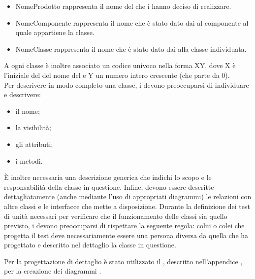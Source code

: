					\begin{itemize}
						\item NomeProdotto rappresenta il nome del   che i  hanno deciso di realizzare.
						\item NomeComponente rappresenta il nome che è stato dato dai  al componente al quale appartiene la classe.
						\item NomeClasse rappresenta il nome che è stato dato dai  alla classe individuata.
					\end{itemize}
					A ogni classe è inoltre associato un codice univoco nella forma XY, dove X è l'iniziale del del nome del  e Y un numero intero crescente (che parte da 0).\\
				 \label{sec:DescrizioneClasse}
					Per descrivere in modo completo una classe, i  devono preoccuparsi di individuare e descrivere:
					\begin{itemize}
						\item il nome;
						\item la visibilità;
						\item gli attributi;
						\item i metodi.
					\end{itemize}
					È inoltre necessaria una descrizione generica che indichi lo scopo e le responsabilità della classe in questione. Infine, devono essere descritte dettagliatamente (anche mediante l'uso di appropriati diagrammi) le relazioni con altre classi e le interfacce che mette a disposizione.
				 \label{sec:TestUnita}
					Durante la definizione dei test di unità necessari per verificare che il funzionamento delle classi sia quello previsto, i  devono preoccuparsi di rispettare la seguente regola: colui o colei che progetta il test deve necessariamente essere una persona diversa da quella che ha progettato e descritto nel dettaglio la classe in questione.

				Per la progettazione di dettaglio è stato utilizzato il  , descritto nell'appendice , per la creazione dei diagrammi .

